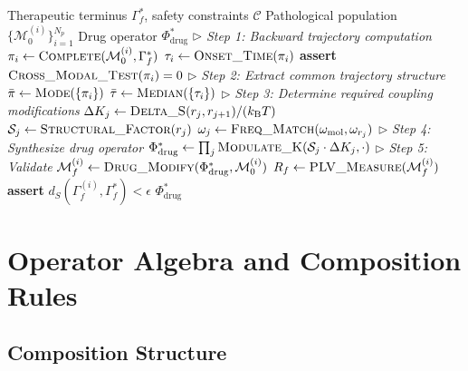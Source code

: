 \documentclass[10pt,twocolumn]{article}
\theoremstyle{remark}
\newcommand{\Gstate}{\Gamma}
\newcommand{\kB}{k_{\mathrm{B}}}
\newcommand{\Mstate}{\mathcal{M}}
\newcommand{\dS}{d_S}
\begin{document}
\begin{algorithm}[t]
\caption{Drug Design via Poincar\'{e} Computing}
\label{alg:poincare_drug}
\begin{algorithmic}[1]
\Require Therapeutic terminus $\Gstate_f^*$, safety constraints $\mathcal{C}$
\Require Pathological population $\{\Mstate_0^{(i)}\}_{i=1}^{N_p}$
\Ensure Drug operator $\Phi_{\mathrm{drug}}^*$
\State $\triangleright$ \textit{Step 1: Backward trajectory computation}
\ForAll{$\Mstate_0^{(i)} \in \{\Mstate_0^{(i)}\}$}
    \State $\pi_i \gets \textsc{Complete}(\Mstate_0^{(i)}, \Gstate_f^*)$
    \State $\tau_i \gets \textsc{Onset\_Time}(\pi_i)$
    \State \textbf{assert} $\textsc{Cross\_Modal\_Test}(\pi_i) = 0$ 
\EndFor
\State $\triangleright$ \textit{Step 2: Extract common trajectory structure}
\State $\bar{\pi} \gets \textsc{Mode}(\{\pi_i\})$ 
\State $\bar{\tau} \gets \textsc{Median}(\{\tau_i\})$
\State $\triangleright$ \textit{Step 3: Determine required coupling modifications}
    \State $\Delta K_j \gets \textsc{Delta\_S}(r_j, r_{j+1}) / (\kB T)$
    \State $\mathcal{S}_j \gets \textsc{Structural\_Factor}(r_j)$
    \State $\omega_j \gets \textsc{Freq\_Match}(\omega_{\mathrm{mol}}, \omega_{r_j})$
\EndFor
\State $\triangleright$ \textit{Step 4: Synthesize drug operator}
\State $\Phi_{\mathrm{drug}}^* \gets \prod_j \textsc{Modulate\_K}(\mathcal{S}_j \cdot \Delta K_j, \cdot)$
\State $\triangleright$ \textit{Step 5: Validate}
\ForAll{$\Mstate_0^{(i)}$}
    \State $\Mstate_f^{(i)} \gets \textsc{Drug\_Modify}(\Phi_{\mathrm{drug}}^*, \Mstate_0^{(i)})$
    \State $R_f \gets \textsc{PLV\_Measure}(\Mstate_f^{(i)})$
    \State \textbf{assert} $\dS(\Gstate_f^{(i)}, \Gstate_f^*) < \epsilon$
\EndFor
\State \Return $\Phi_{\mathrm{drug}}^*$
\end{algorithmic}
\end{algorithm}

\section{Operator Algebra and Composition Rules}
\label{sec:algebra}

\subsection{Composition Structure}
\end{document}
